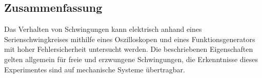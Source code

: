 \subsection{Zusammenfassung}
Das Verhalten von Schwingungen kann elektrisch anhand eines Serienschwingkreises mithilfe eines Oszilloskopen und eines Funktionsgenerators mit hoher Fehlersicherheit untersucht werden.
Die beschriebenen Eigenschaften gelten allgemein für freie und erzwungene Schwingungen, die Erkenntnisse dieses Experimentes sind auf mechanische Systeme übertragbar.
